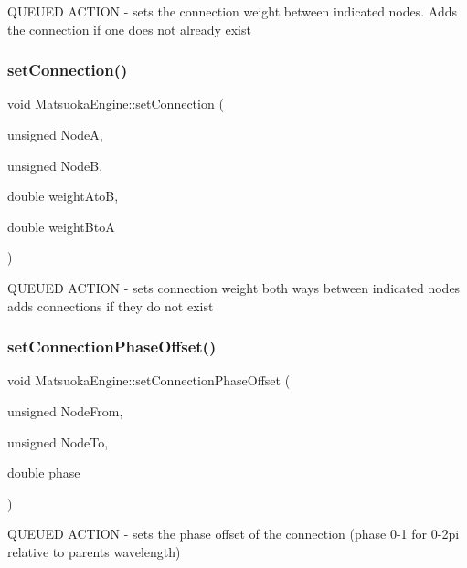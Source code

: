 Q\+U\+E\+U\+ED A\+C\+T\+I\+ON -\/ sets the connection weight between indicated nodes. Adds the connection if one does not already exist \mbox{\label{classMatsuokaEngine_a1335ac9672e6443135d78a8192b5aad5}} 
\subsubsection{\texorpdfstring{set\+Connection()}{setConnection()}\hspace{0.1cm}{\footnotesize\ttfamily [2/2]}}
{\footnotesize\ttfamily void Matsuoka\+Engine\+::set\+Connection (\begin{DoxyParamCaption}\item[{unsigned}]{NodeA,  }\item[{unsigned}]{NodeB,  }\item[{double}]{weight\+AtoB,  }\item[{double}]{weight\+BtoA }\end{DoxyParamCaption})}

Q\+U\+E\+U\+ED A\+C\+T\+I\+ON -\/ sets connection weight both ways between indicated nodes adds connections if they do not exist \mbox{\label{classMatsuokaEngine_a22045d1c6d6c8bcf2b282c9c98e46f13}} 
\subsubsection{\texorpdfstring{set\+Connection\+Phase\+Offset()}{setConnectionPhaseOffset()}}
{\footnotesize\ttfamily void Matsuoka\+Engine\+::set\+Connection\+Phase\+Offset (\begin{DoxyParamCaption}\item[{unsigned}]{Node\+From,  }\item[{unsigned}]{Node\+To,  }\item[{double}]{phase }\end{DoxyParamCaption})}



Q\+U\+E\+U\+ED A\+C\+T\+I\+ON -\/ sets the phase offset of the connection (phase 0-\/1 for 0-\/2pi relative to parent\textquotesingle{}s wavelength) 

